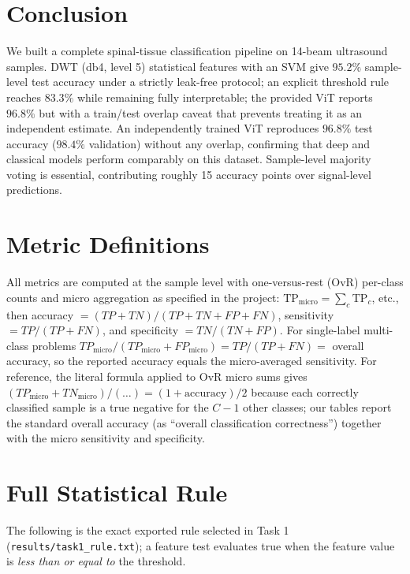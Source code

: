 \documentclass[11pt]{article}
\begin{document}
\section{Conclusion}

We built a complete spinal-tissue classification pipeline on 14-beam
ultrasound samples. DWT (db4, level 5) statistical features with an SVM give
$95.2\%$ sample-level test accuracy under a strictly leak-free protocol; an
explicit threshold rule reaches $83.3\%$ while remaining fully interpretable;
the provided ViT reports $96.8\%$ but with a train/test overlap caveat that
prevents treating it as an independent estimate. An independently trained ViT
reproduces $96.8\%$ test accuracy ($98.4\%$ validation) without any overlap,
confirming that deep and classical models perform comparably on this dataset. Sample-level majority voting
is essential, contributing roughly 15 accuracy points over signal-level
predictions.

\appendix

\section{Metric Definitions}
\label{app:metrics}

All metrics are computed at the sample level with one-versus-rest (OvR)
per-class counts and micro aggregation as specified in the project:
$\mathrm{TP}_{\mathrm{micro}}=\sum_c \mathrm{TP}_c$, etc., then
accuracy $=(TP+TN)/(TP+TN+FP+FN)$, sensitivity $=TP/(TP+FN)$, and
specificity $=TN/(TN+FP)$.
For single-label multi-class problems $TP_{\mathrm{micro}}/(TP_{\mathrm{micro}}+FP_{\mathrm{micro}})
= TP/(TP+FN) =$ overall accuracy, so the reported accuracy equals the
micro-averaged sensitivity. For reference, the literal formula applied to OvR
micro sums gives $(TP_{\mathrm{micro}}+TN_{\mathrm{micro}})/(\dots) = (1+\text{accuracy})/2$
because each correctly classified sample is a true negative for the $C-1$
other classes; our tables report the standard overall accuracy
(as ``overall classification correctness'') together with the micro
sensitivity and specificity.

\section{Full Statistical Rule}
\label{app:rule}

The following is the exact exported rule selected in Task 1
(\texttt{results/task1\_rule.txt}); a feature test evaluates true when the
feature value is \emph{less than or equal to} the threshold.
\end{document}
